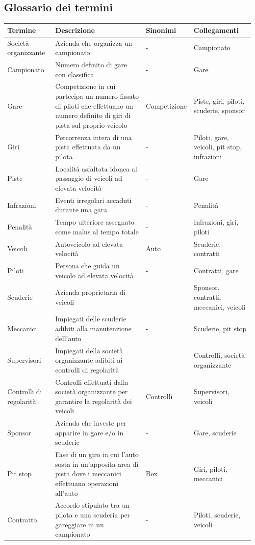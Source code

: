 \documentclass[11pt]{article}
\begin{document}
\subsection{Glossario dei termini}
\begin{tabularx}{\linewidth}{
        |>{\hsize=0.6\hsize}X|%
        >{\hsize=1.8\hsize}X|%
        >{\hsize=0.6\hsize}X|%
        >{\hsize=1.0\hsize}X|%
    }
    \hline
    \textbf{Termine} & \textbf{Descrizione} & \textbf{Sinonimi} & \textbf{Collegamenti} \\
    \hline
    Società organizzante & Azienda che organizza un campionato & - & Campionato \\
    \hline
    Campionato & Numero definito di gare con classifica & - & Gare \\
    \hline
    Gare & Competizione in cui partecipa un numero fissato di piloti che effettuano un numero definito di giri di pista sul proprio veicolo & Competizione & Piste, giri, piloti, scuderie, sponsor \\
    \hline
    Giri & Percorrenza intera di una pista effettuata da un pilota & - & Piloti, gare, veicoli, pit stop, infrazioni \\
    \hline
    Piste & Località asfaltata idonea al passaggio di veicoli ad elevata velocità & - & Gare \\
    \hline
    Infrazioni & Eventi irregolari accaduti durante una gara & - & Penalità \\
    \hline
    Penalità & Tempo ulteriore assegnato come malus al tempo totale & - & Infrazioni, giri, piloti \\
    \hline
    Veicoli & Autoveicolo ad elevata velocità & Auto & Scuderie, contratti \\
    \hline
    Piloti & Persona che guida un veicolo ad elevata velocità & - & Contratti, gare \\
    \hline
    Scuderie & Azienda proprietaria di veicoli & - & Sponsor, contratti, meccanici, veicoli \\
    \hline
    Meccanici & Impiegati delle scuderie adibiti alla manutenzione dell'auto & - & Scuderie, pit stop \\
    \hline
    Supervisori & Impiegati della società organizzante adibiti ai controlli di regolarità & - & Controlli, società organizzante \\
    \hline
    Controlli di regolarità & Controlli effettuati dalla società organizzante per garantire la regolarità dei veicoli & Controlli & Supervisori, veicoli \\
    \hline
    Sponsor & Azienda che investe per apparire in gare e/o in scuderie & - & Gare, scuderie \\
    \hline
    Pit stop & Fase di un giro in cui l'auto sosta in un'apposita area di pista dove i meccanici effettuano operazioni all'auto & Box & Giri, piloti, meccanici \\
    \hline
    Contratto & Accordo stipulato tra un pilota e una scuderia per gareggiare in un campionato & - & Piloti, scuderie, veicoli \\
    \hline
\end{tabularx}
\end{document}

